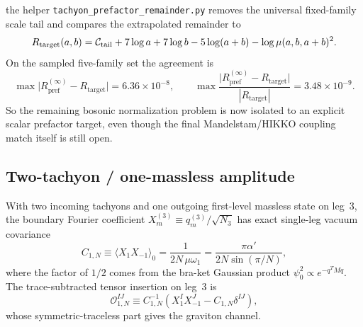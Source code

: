 \documentclass[11pt]{article}
\newcommand{\al}{\alpha'}
\begin{document}
the helper \texttt{tachyon\_prefactor\_remainder.py} removes the universal
fixed-family scale tail and compares the extrapolated remainder to
\begin{equation}
R_{\mathrm{target}}(a,b)
=
{\cal C}_{\mathrm{tail}}
 + 7\log a + 7\log b - 5\log(a+b)
 - \log\mu(a,b,a+b)^2.
\label{eq:companion-pref-target}
\end{equation}
On the sampled five-family set the agreement is
\begin{equation}
\max\bigl|R_{\mathrm{pref}}^{(\infty)}-R_{\mathrm{target}}\bigr|
=6.36\times 10^{-8},
\qquad
\max
\frac{\bigl|R_{\mathrm{pref}}^{(\infty)}-R_{\mathrm{target}}\bigr|}{|R_{\mathrm{target}}|}
=3.48\times 10^{-9}.
\label{eq:companion-pref-target-error}
\end{equation}
So the remaining bosonic normalization problem is now isolated to an explicit
scalar prefactor target, even though the final Mandelstam/HIKKO coupling match
itself is still open.

\subsection{Two-tachyon / one-massless amplitude}

With two incoming tachyons and one outgoing first-level massless state on leg~3, the boundary Fourier coefficient $X_m^{(3)} \equiv q_m^{(3)}/\sqrt{N_3}$ has exact single-leg vacuum covariance
\begin{equation}
C_{1,N} \equiv \langle X_1 X_{-1}\rangle_0 = \frac{1}{2N\,\mu\omega_1} = \frac{\pi\al}{2N\sin(\pi/N)},
\label{eq:c1n}
\end{equation}
where the factor of $1/2$ comes from the bra-ket Gaussian product $\psi_0^2 \propto e^{-q^T M q}$. The trace-subtracted tensor insertion on leg~3 is
\begin{equation}
\mathcal{O}_{1,N}^{IJ} \equiv C_{1,N}^{-1}\!\left(X_1^I X_{-1}^J - C_{1,N}\delta^{IJ}\right),
\label{eq:O-insertion}
\end{equation}
whose symmetric-traceless part gives the graviton channel.
\end{document}
